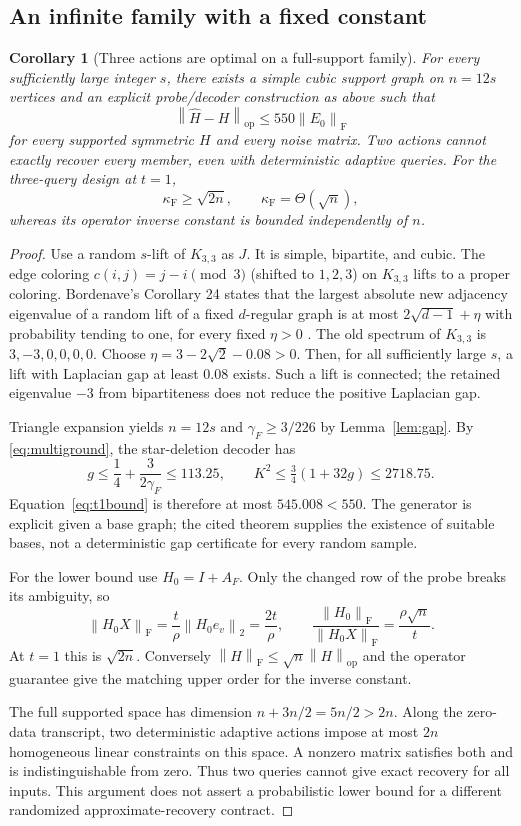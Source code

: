 \documentclass[11pt]{article}
\newtheorem{corollary}[theorem]{Corollary}
\theoremstyle{remark}\newtheorem{remark}[theorem]{Remark}
\newcommand{\op}{\mathrm{op}}
\newcommand{\F}{\mathrm F}
\newcommand{\norm}[1]{\left\lVert #1\right\rVert}
\begin{document}
\subsection{An infinite family with a fixed constant}

\begin{corollary}[Three actions are optimal on a full-support family]\label{cor:family}
For every sufficiently large integer $s$, there exists a simple cubic support graph on $n=12s$ vertices and an explicit probe/decoder construction as above such that
\[
\norm{\widehat H-H}_{\op}\leq550\norm{E_0}_{\F}
\]
for every supported symmetric $H$ and every noise matrix. Two actions cannot exactly recover every member, even with deterministic adaptive queries. For the three-query design at $t=1$,
\[
\kappa_{\F}\geq\sqrt{2n},\qquad\kappa_{\F}=\Theta(\sqrt n),
\]
whereas its operator inverse constant is bounded independently of $n$.
\end{corollary}

\begin{proof}
Use a random $s$-lift of $K_{3,3}$ as $J$. It is simple, bipartite, and cubic. The edge coloring $c(i,j)=j-i\pmod3$ (shifted to $1,2,3$) on $K_{3,3}$ lifts to a proper coloring. Bordenave's Corollary 24 states that the largest absolute new adjacency eigenvalue of a random lift of a fixed $d$-regular graph is at most $2\sqrt{d-1}+\eta$ with probability tending to one, for every fixed $\eta>0$ \cite{bordenave}. The old spectrum of $K_{3,3}$ is $3,-3,0,0,0,0$. Choose $\eta=3-2\sqrt2-0.08>0$. Then, for all sufficiently large $s$, a lift with Laplacian gap at least $0.08$ exists. Such a lift is connected; the retained eigenvalue $-3$ from bipartiteness does not reduce the positive Laplacian gap.

Triangle expansion yields $n=12s$ and $\gamma_F\geq3/226$ by Lemma~\ref{lem:gap}. By \eqref{eq:multiground}, the star-deletion decoder has
\[
g\leq\frac14+\frac3{2\gamma_F}\leq113.25,\qquad
K^2\leq\tfrac34(1+32g)\leq2718.75.
\]
Equation~\eqref{eq:t1bound} is therefore at most $545.008<550$.
The generator is explicit given a base graph; the cited theorem supplies the existence of suitable bases, not a deterministic gap certificate for every random sample.

For the lower bound use $H_0=I+A_F$. Only the changed row of the probe breaks its ambiguity, so
\[
\norm{H_0X}_{\F}=\frac t\rho\norm{H_0e_v}_2
=\frac{2t}{\rho},\qquad
\frac{\norm{H_0}_{\F}}{\norm{H_0X}_{\F}}=\frac{\rho\sqrt n}{t}.
\]
At $t=1$ this is $\sqrt{2n}$. Conversely $\norm H_{\F}\leq\sqrt n\norm H_{\op}$ and the operator guarantee give the matching upper order for the inverse constant.

The full supported space has dimension $n+3n/2=5n/2>2n$. Along the zero-data transcript, two deterministic adaptive actions impose at most $2n$ homogeneous linear constraints on this space. A nonzero matrix satisfies both and is indistinguishable from zero. Thus two queries cannot give exact recovery for all inputs. This argument does not assert a probabilistic lower bound for a different randomized approximate-recovery contract.
\end{proof}
\end{document}

